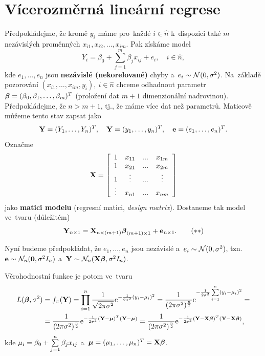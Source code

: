 \chapter{Vícerozměrná lineární regrese}

Předpokládejme, že kromě $y_i$ máme pro~každé $i\in\widehat{n}$ k~dispozici také $m$ nezávislých proměnných $x_{i1},x_{i2},\dots,x_{im}$. Pak získáme model
 $$ Y_i = \beta_0+\sum_{j = 1}^m \beta_j x_{ij}+e_i,\quad i\in\widehat{n}, $$
kde $e_1,\dots,e_n$ jsou \textbf{nezávislé (nekorelované)} chyby a~$e_i\sim\mathcal{N}(0,\sigma^2)$. Na~základě pozorování $(x_{i1},\dots,x_{im},y_i),~i\in\widehat{n}$ chceme odhadnout parametr $\boldsymbol{\beta} = (\beta_0,\beta_1,\dots,\beta_m)^T$ (proložení dat \linebreak $m+1$ dimenzionální nadrovinou). Předpokládejme, že $n>m+1$, tj., že máme více dat než parametrů. Maticově můžeme tento stav zapsat jako
 $$ \mathbf{Y} = (Y_1,\dots,Y_n)^T,\quad \mathbf{Y} = (y_1,\dots,y_n)^T,\quad \mathbf{e} = (e_1,\dots,e_n)^T. $$
Označme
 $$ \mathbf{X} = \left[\begin{array}{cccc}
1 & x_{11} &... & x_{1m} \\
1 & x_{21} &... & x_{2m} \\
1 & \vdots &... & \vdots \\
 \vdots& x_{n1} &... & x_{nm}
\end{array}
 \right] $$ jako \textbf{matici modelu} (regresní matici, \textit{design matrix}). Dostaneme tak model ve~tvaru (důležitém)
  \begin{equation}\label{the_chosen_one}
 \mathbf{Y}_{n\times 1} = \mathbf{X}_{n\times(m+1)}\boldsymbol{\beta}_{(m+1)\times 1}+\mathbf{e}_{n\times 1}. \tag{$**$}
 \end{equation}

 Nyní budeme předpokládat, že $e_1,\dots,e_n$ jsou nezávislé a~$e_i \sim\mathcal{N}(0,\sigma^2)$, tzn. $\mathbf{e}\sim\mathcal{N}_n(\boldsymbol{0},\sigma^2 I_n)$ a~$\mathbf{Y}\sim\mathcal{N}_n(\mathbf{X}\boldsymbol{\beta},\sigma^2 I_n)$.

 Věrohodnostní funkce je potom ve~tvaru
 \begin{align*}
 L(\boldsymbol{\beta},\sigma^2)& = f_\pi(\mathbf{Y}) = \prod_{i = 1}^n \frac{1}{\sqrt{2\pi\sigma^2}}\mathrm{e}^{-\frac{1}{2\sigma^2}(y_i-\mu_i)^2} = \frac{1}{(2\pi\sigma^2)^{\frac{n}{2}}}\mathrm{e}^{-\frac{1}{2\sigma^2}\sum\limits_{i=1}^{n} (y_i-\mu_i)^2} = \\ & = \frac{1}{(2\pi\sigma^2)^{\frac{n}{2}}}\mathrm{e}^{-\frac{1}{2\sigma^2}(\mathbf{Y}-\boldsymbol{\mu})^T(\mathbf{Y}-\boldsymbol{\mu})} = \frac{1}{(2\pi\sigma^2)^{\frac{n}{2}}}\mathrm{e}^{-\frac{1}{2\sigma^2}(\mathbf{Y}-\mathbf{X}\boldsymbol{\beta})^T(\mathbf{Y}-\mathbf{X}\boldsymbol{\beta})},
 \end{align*}
kde $\mu_i = \beta_0+\sum\limits_{j=1}^{n} \beta_j x_{ij}$ a~$\boldsymbol{\mu} = (\mu_1,\dots,\mu_n)^T = \mathbf{X}\boldsymbol{\beta}$.

